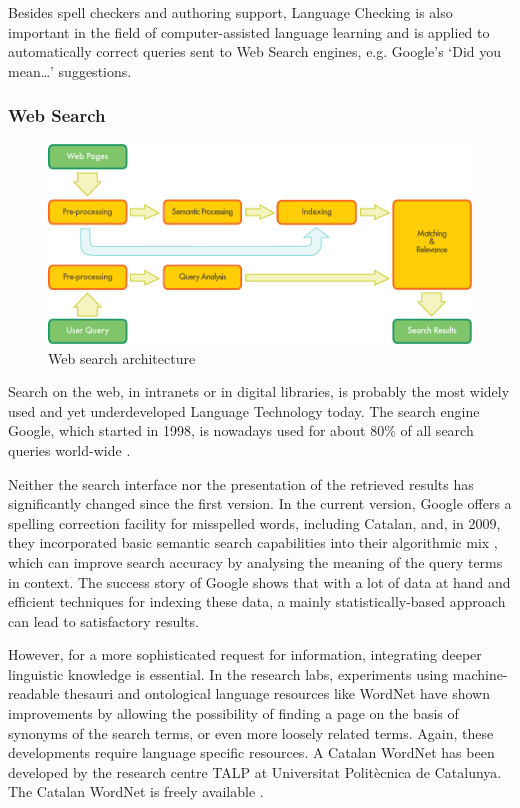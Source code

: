 \begin{multicols}{2}
Besides spell checkers and authoring support, Language Checking is also important in the field of computer-assisted language learning and is applied to automatically correct queries sent to Web Search engines, e.g. Google’s ‘Did you mean…’ suggestions. 

\subsubsection{Web Search}

\begin{figure}[htb]
  \center
  \includegraphics[width=\textwidth]{../_media/english/web_search_architecture}
  \caption{Web search architecture}
  \label{fig:websearcharch_en}
 \end{figure}

Search on the web, in intranets or in digital libraries, is probably the most widely used and yet underdeveloped Language Technology today. The search engine Google, which started in 1998, is nowadays used for about 80\% of all search queries world-wide \cite{CAT-Nota22}. 

Neither the search interface nor the presentation of the retrieved results has significantly changed since the first version. In the current version, Google offers a spelling correction facility for misspelled words, including Catalan, and, in 2009, they incorporated basic semantic search capabilities into their algorithmic mix \cite{CAT-Nota23}, which can improve search accuracy by analysing the meaning of the query terms in context. The success story of Google shows that with a lot of data at hand and efficient techniques for indexing these data, a mainly statistically-based approach can lead to satisfactory results. 

However, for a more sophisticated request for information, integrating deeper linguistic knowledge is essential. In the research labs, experiments using machine-readable thesauri and ontological language resources like WordNet have shown improvements by allowing the possibility of finding a page on the basis of synonyms of the search terms, or even more loosely related terms. Again, these developments require language specific resources. A Catalan WordNet has been developed by the research centre TALP at Universitat Politècnica de Catalunya. The Catalan WordNet is freely available \cite{CAT-Nota24}.


\end{multicols}
